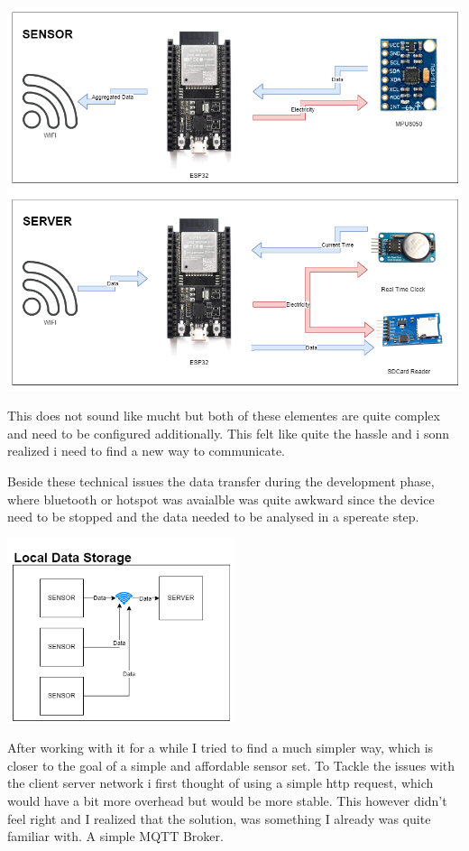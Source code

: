 \includegraphics[width=\linewidth]{images/CommunicationDiagrammExplenation.png}

This does not sound like mucht but both of these elementes are quite complex and need to be configured additionally. This felt like quite the hassle and i sonn realized i need to find a new way to communicate.

Beside these technical issues the data transfer during the development phase, where bluetooth or hotspot was avaialble was quite awkward since the device need to be stopped and the data needed to be analysed in a spereate step. 


\begin{center}
\includegraphics[width=0.5\textwidth]{images/CommunicationDiagrammLocal.png}
 \end{center}
After working with it for a while I tried to find a much simpler way, which is closer to the goal of a simple and affordable sensor set. To Tackle the issues with the client server network i first thought of using a simple http request, which would have a bit more overhead but would be more stable. This however didn't feel right and I realized that the solution, was something I already was quite familiar with. A simple MQTT Broker. 



